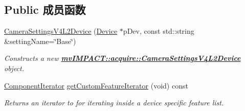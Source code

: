 \subsection*{Public 成员函数}
\begin{DoxyCompactItemize}
\item 
\hyperlink{classmv_i_m_p_a_c_t_1_1acquire_1_1_camera_settings_v4_l2_device_aa8462fef321b1ddfd69166fbedcb136f}{Camera\+Settings\+V4\+L2\+Device} (\hyperlink{classmv_i_m_p_a_c_t_1_1acquire_1_1_device}{Device} $\ast$p\+Dev, const std\+::string \&setting\+Name=\char`\"{}Base\char`\"{})
\begin{DoxyCompactList}\small\item\em Constructs a new {\bfseries \hyperlink{classmv_i_m_p_a_c_t_1_1acquire_1_1_camera_settings_v4_l2_device}{mv\+I\+M\+P\+A\+C\+T\+::acquire\+::\+Camera\+Settings\+V4\+L2\+Device}} object. \end{DoxyCompactList}\item 
\hyperlink{group___common_interface_ga461a5ba2197d9e599ee35e2514d684ef}{Component\+Iterator} \hyperlink{classmv_i_m_p_a_c_t_1_1acquire_1_1_camera_settings_v4_l2_device_a5e756f77e22f90646cf9bad95fbad451}{get\+Custom\+Feature\+Iterator} (void) const 
\begin{DoxyCompactList}\small\item\em Returns an iterator to for iterating inside a device specific feature list. \end{DoxyCompactList}\end{DoxyCompactItemize}
